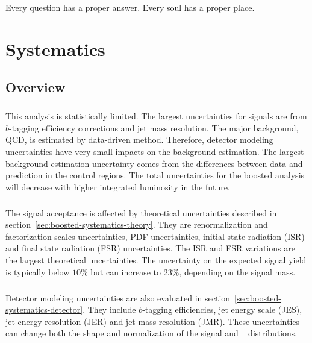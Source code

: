 \begin{savequote}[75mm]
Every question has a proper answer. Every soul has a proper place.
\end{savequote}

\chapter{Systematics}
\label{sec:systematics}


\section{Overview}
\label{sec:systematics-overview}
\paragraph{}
This analysis is statistically limited.
The largest uncertainties for signals are from $b$-tagging efficiency corrections and jet mass resolution.
The major background, QCD, is estimated by data-driven method. 
Therefore, detector modeling uncertainties have very small impacts on the background estimation.
The largest background estimation uncertainty comes from the differences between data and prediction in the control regions.
The total uncertainties for the boosted analysis will decrease with higher integrated luminosity in the future.

\paragraph{}
The signal acceptance is affected by theoretical uncertainties described in section~\ref{sec:boosted-systematics-theory}.
They are renormalization and factorization scales uncertainties, PDF uncertainties, initial state radiation (ISR) and final state radiation (FSR) uncertainties.
The ISR and FSR variations are the largest theoretical uncertainties.
The uncertainty on the expected signal yield is typically below $10\%$ but can increase to $23\%$, depending on the signal mass.

\paragraph{}
Detector modeling uncertainties are also evaluated in section~\ref{sec:boosted-systematics-detector}.
They include $b$-tagging efficiencies, jet energy scale (JES), jet energy resolution (JER) and jet mass resolution (JMR).
These uncertainties can change both the shape and normalization of the signal and \ttbar~ distributions.

